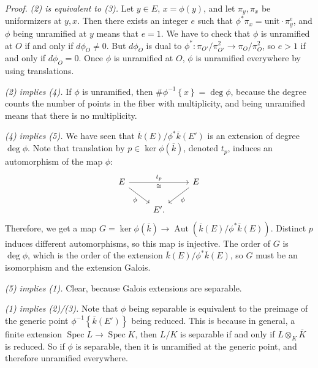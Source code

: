 \textit{Proof.}
\textit{(2) is equivalent to (3).}
Let \( y \in E \), \( x = \phi(y) \), and let \( \pi_y, \pi_x \) be uniformizers at \( y,x \).
Then there exists an integer \( e \) such that \( \phi^* \pi_x = \text{unit} \cdot \pi_y^e \), and \( \phi \) being unramified at \( y \) means that \( e = 1 \).
We have to check that \( \phi \) is unramified at \( O \) if and only if \( d \phi_O \neq 0 \).
But \( d \phi_O \) is dual to \( \phi^* \colon \pi_{O'} / \pi_{O'}^2 \to \pi_O / \pi_O^2 \), so \( e > 1 \) if and only if \( d \phi_O = 0 \).
Once \( \phi \) is unramified at \( O \), \( \phi \) is unramified everywhere by using translations.

\textit{(2) implies (4).}
If \( \phi \) is unramified, then \( \# \phi^{-1} \left\lbrace x \right\rbrace = \deg \phi \), because the degree counts the number of points in the fiber with multiplicity, and being unramified means that there is no multiplicity.

\textit{(4) implies (5).}
We have seen that \( \overline{k}(E) / \phi^* \overline{k}(E') \) is an extension of degree \( \operatorname{deg} \phi \).
Note that translation by \( p \in \ker \phi ( \overline{k} ) \), denoted \( t_p \), induces an automorphism of the map \( \phi \):
\[
\begin{tikzcd}
  E \arrow[rr,"t_p","\cong"'] \arrow[dr,"\phi"'] & & E \arrow[dl,"\phi"] \\
  & E' .
\end{tikzcd}
\]
Therefore, we get a map \( G = \ker \phi( \overline{k} ) \to \operatorname{Aut} \left( \overline{k}(E) / \phi^* \overline{k}(E) \right) \).
Distinct \( p \) induces different automorphisms, so this map is injective.
The order of \( G \) is \( \operatorname{deg} \phi \), which is the order of the extension \( \overline{k}(E) / \phi^* \overline{k}(E) \), so \( G \) must be an isomorphism and the extension Galois.

\textit{(5) implies (1).}
Clear, because Galois extensions are separable.

\textit{(1) implies (2)/(3).}
Note that \( \phi \) being separable is equivalent to the preimage of the generic point \( \phi^{-1} \left\lbrace \overline{k}(E') \right\rbrace \) being reduced. This is because in general, a finite extension \( \operatorname{Spec} L \to \operatorname{Spec} K \), then \( L/K \) is separable if and only if \( L \otimes_K \overline{K} \) is reduced.
So if \( \phi \) is separable, then it is unramified at the generic point, and therefore unramified everywhere.

